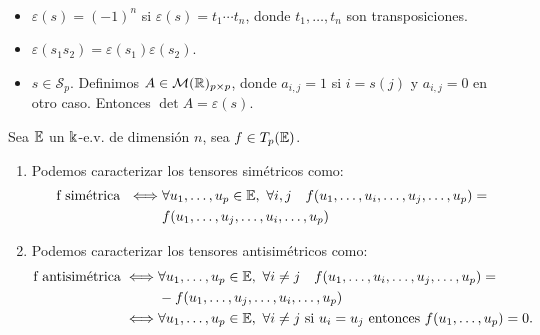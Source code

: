 \begin{obs}~
    \begin{itemize}
        \item $\varepsilon (s) = (-1)^n$ si $\varepsilon (s) = t_1 \cdots t_n$, donde
        $t_1,\dots,t_n$ son transposiciones.
        \item $\varepsilon (s_1 s_2) = \varepsilon (s_1) \varepsilon(s_2)$.
        \item $s \in \mathcal{S}_p$. Definimos $A \in \mathcal{M}(\mathbb{R})_{p\times p}$, donde
        $a_{i,j} = 1$ si $i = s(j)$ y $a_{i,j} = 0$ en otro caso. Entonces
        $\det A = \varepsilon(s)$.
    \end{itemize}
\end{obs}
\begin{prop}\label{prop:sim_comp}
    Sea $\mathbb{E}$ un $\Bbbk$-e.v. de dimensión $n$, sea $f \in T_p(\mathbb{E})$.
    \begin{enumerate}
        \item Podemos caracterizar los tensores simétricos como:
        \[
        \begin{split}\text{f simétrica } \iff &
        \forall u_1,\dots,u_p \in \mathbb{E}, \  \forall i,j \quad
        f(u_1,\dots,u_i,\dots,u_j,\dots,u_p) = \\
        &f(u_1,\dots,u_j,\dots,u_i,\dots,u_p)
        \end{split}
        \]
        \item Podemos caracterizar los tensores antisimétricos como:
        \[
        \begin{split}\text{f antisimétrica} \iff &
        \forall u_1,\dots,u_p \in \mathbb{E}, \  \forall i \neq j \quad
        f(u_1,\dots,u_i,\dots,u_j,\dots,u_p) = \\
        &-f(u_1,\dots,u_j,\dots,u_i,\dots,u_p)\\
        \iff& \forall u_1,\dots,u_p \in \mathbb{E}, \ \forall i \neq j \text{ si } u_i=u_j
        \text{ entonces } f(u_1,\dots,u_p) = 0.
        \end{split}\]
    \end{enumerate}
\end{prop}
